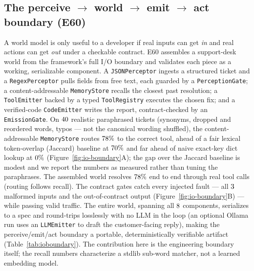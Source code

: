 \documentclass[11pt]{article}
\begin{document}
\begin{table}[htb]
\centering
\caption{\textbf{E59 brain architectures} on the recalled-fact+verify suite, with the
LLM backbone held constant. Memory and verified best-of-$N$ each add accuracy; the
optimized brain reaches $\ArchOpt$ ($+\ArchLift$ over the bare LLM).}
\label{tab:brainarch}

\end{table}

\subsection{The perceive $\to$ world $\to$ emit $\to$ act boundary (E60)}\label{sec:ioboundary}
A world model is only useful to a developer if real inputs can get \emph{in} and real
actions can get \emph{out} under a checkable contract. E60 assembles a support-desk
world from the framework's full I/O boundary and validates each piece as a working,
serializable component. A \texttt{JSONPerceptor} ingests a structured ticket and a
\texttt{RegexPerceptor} pulls fields from free text, each guarded by a
\texttt{PerceptionGate}; a content-addressable \texttt{MemoryStore} recalls the closest
past resolution; a \texttt{ToolEmitter} backed by a typed \texttt{ToolRegistry} executes
the chosen fix; and a verified-code \texttt{CodeEmitter} writes the report, contract-checked
by an \texttt{EmissionGate}. On $40$ realistic paraphrased tickets (synonyms,
dropped and reordered words, typos --- not the canonical wording shuffled), the
content-addressable \texttt{MemoryStore} routes $78\%$ to the correct tool, ahead of
a fair lexical token-overlap (Jaccard) baseline at $70\%$ and far ahead of naive
exact-key dict lookup at $0\%$ (Figure~\ref{fig:io-boundary}A); the gap over the
Jaccard baseline is modest and we report the numbers as measured rather than tuning the
paraphrases. The assembled world resolves $78\%$ end to end through real tool calls
(routing follows recall). The contract gates catch every injected fault --- all
$3$ malformed inputs and the out-of-contract output
(Figure~\ref{fig:io-boundary}B) --- while passing valid traffic. The entire world,
spanning all $8$ components, serializes to a spec and round-trips losslessly
with no LLM in the loop (an optional Ollama run uses an \texttt{LLMEmitter} to draft the
customer-facing reply), making the perceive/emit/act boundary a portable, deterministically
verifiable artifact (Table~\ref{tab:ioboundary}). The contribution here is the
engineering boundary itself; the recall numbers characterize a stdlib sub-word matcher,
not a learned embedding model.
\end{document}
